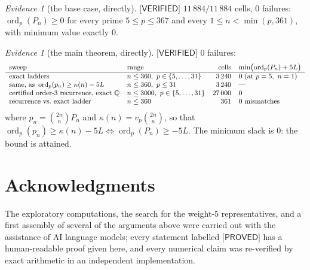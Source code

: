 \documentclass[11pt,reqno]{amsart}
\theoremstyle{plain}
\theoremstyle{definition}
\theoremstyle{remark}
\newtheorem{evidence}[theorem]{Evidence}
\numberwithin{equation}{section}
\newcommand{\QQ}{\mathbb{Q}}
\newcommand{\ord}{\operatorname{ord}}
\newcommand{\PROVED}{\textsf{[PROVED]}}
\newcommand{\VERIFIED}{\textsf{[VERIFIED]}}
\begin{document}
\begin{evidence}[the base case, directly]\label{ev:base}
$\VERIFIED$ $11\,884/11\,884$ cells, $0$ failures: $\ord_p(P_n)\ge0$ for every prime
$5\le p\le367$ and every $1\le n<\min(p,361)$, with minimum value exactly $0$.
\end{evidence}

\begin{evidence}[the main theorem, directly]\label{ev:sweep}
$\VERIFIED$ $0$ failures:
\[
\small
\begin{array}{llrl}
\text{sweep} & \text{range} & \text{cells} & \min\bigl(\ord_p(P_n)+5L\bigr)\\\hline
\text{exact ladders} & n\le360,\ p\in\{5,\dots,31\} & 3\,240 & 0\ (\text{at } p=5,\ n=1)\\
\text{same, as } \ord_p(p_n)\ge\kappa(n)-5L & n\le360,\ p\le31 & 3\,240 & \text{---}\\
\text{certified order-3 recurrence, exact }\QQ & n\le3000,\ p\in\{5,\dots,31\} & 27\,000 & 0\\
\text{recurrence vs.\ exact ladder} & n\le360 & 361 & \text{0 mismatches}
\end{array}
\]
where $p_n=\binom{2n}{n}P_n$ and $\kappa(n)=v_p\binom{2n}{n}$, so that
$\ord_p(p_n)\ge\kappa(n)-5L\iff\ord_p(P_n)\ge-5L$. The minimum slack is $0$: the bound is
attained.
\end{evidence}

\section*{Acknowledgments}

The exploratory computations, the search for the weight-$5$ representatives, and a first
assembly of several of the arguments above were carried out with the assistance of AI language
models; every statement labelled $\PROVED$ has a human-readable proof given here, and every
numerical claim was re-verified by exact arithmetic in an independent implementation.
\end{document}
